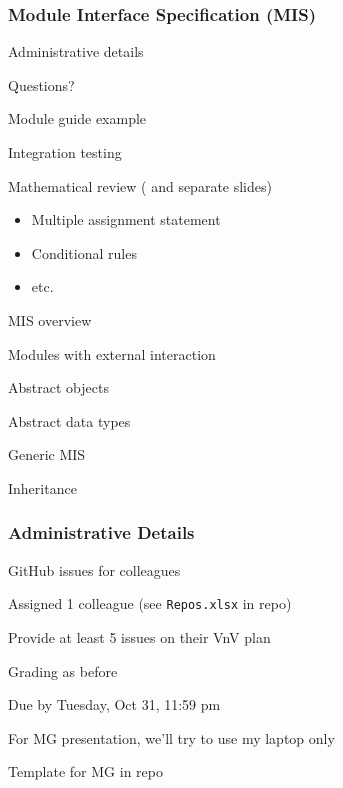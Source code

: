 \documentclass[t,12pt,numbers,fleqn]{beamer}
\begin{document}



\begin{frame}
\frametitle{Module Interface Specification (MIS)}

\bi
\item Administrative details
\item Questions?
\item Module guide example
\item Integration testing
\item Mathematical review (\cite{HoffmanAndStrooper1995} and separate slides)
\begin{itemize}
\item Multiple assignment statement
\item Conditional rules
\item etc.
\end{itemize}
\item MIS overview
\item Modules with external interaction
\item Abstract objects
\item Abstract data types
\item Generic MIS
\item Inheritance
\ei
\end{frame}


\begin{frame}
\frametitle{Administrative Details}

\bi
\item GitHub issues for colleagues
\bi
\item Assigned 1 colleague (see \texttt{Repos.xlsx} in repo)
\item Provide at least 5 issues on their VnV plan
\item Grading as before
\item Due by Tuesday, Oct 31, 11:59 pm
\ei

\item For MG presentation, we'll try to use my laptop only
\item Template for MG in repo

\ei

\end{frame}

\end{document}
